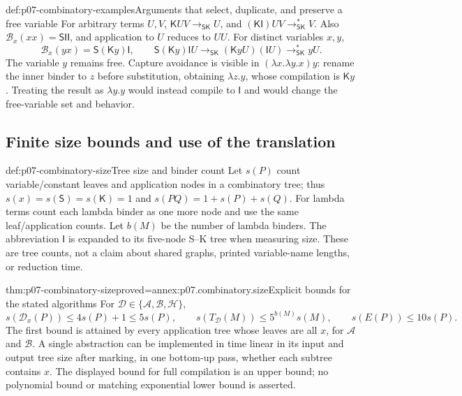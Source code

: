 \begin{hbexample}{def:p07-combinatory-examples}{Arguments that select, duplicate, and preserve a free variable}
For arbitrary terms \(U,V\), \(\mathsf KUV\longrightarrow_{\mathsf{SK}}U\),
and \((\mathsf K\mathsf I)UV\longrightarrow_{\mathsf{SK}}^*V\).
Also \(\mathcal B_x(xx)=\mathsf S\mathsf I\mathsf I\), and application to
\(U\) reduces to \(UU\).
For distinct variables \(x,y\),
\[
 \mathcal B_x(yx)=\mathsf S(\mathsf K y)\mathsf I,
 \qquad
 \mathsf S(\mathsf K y)\mathsf I U
 \longrightarrow_{\mathsf{SK}}(\mathsf K yU)(\mathsf I U)
 \longrightarrow_{\mathsf{SK}}^*yU.
\]
The variable \(y\) remains free.  Capture avoidance is visible in
\((\lambda x.\lambda y.x)y\): rename the inner binder to \(z\) before
substitution, obtaining \(\lambda z.y\), whose compilation is
\(\mathsf K y\).  Treating the result as \(\lambda y.y\) would instead compile
to \(\mathsf I\) and would change the free-variable set and behavior.
\end{hbexample}

\subsection{Finite size bounds and use of the translation}
\label{sec:p07-combinatory-size}

\begin{hbdefinition}{def:p07-combinatory-size}{Tree size and binder count}
Let \(s(P)\) count variable/constant leaves and application nodes in a combinatory
tree; thus \(s(x)=s(\mathsf S)=s(\mathsf K)=1\) and
\(s(PQ)=1+s(P)+s(Q)\).  For lambda terms count each lambda binder as one more
node and use the same leaf/application counts.  Let \(b(M)\) be the number of
lambda binders.  The abbreviation \(\mathsf I\) is expanded to its five-node
S--K tree when measuring size.  These are tree counts, not a claim about shared
graphs, printed variable-name lengths, or reduction time.
\end{hbdefinition}

\begin{hbtheorem}{thm:p07-combinatory-size}{proved=annex:p07.combinatory.size}{Explicit bounds for the stated algorithms}
For \(\mathcal D\in\{\mathcal A,\mathcal B,\mathcal H\}\),
\[
 s(\mathcal D_x(P))\leq4s(P)+1\leq5s(P),\qquad
 s(T_{\mathcal D}(M))\leq5^{b(M)}s(M),\qquad
 s(E(P))\leq10s(P).
\]
The first bound is attained by every application tree whose leaves are all
\(x\), for \(\mathcal A\) and \(\mathcal B\).
A single abstraction can be implemented in time linear in its input and output
tree size after marking, in one bottom-up pass, whether each subtree contains
\(x\).  The displayed bound for full compilation is an upper bound; no
polynomial bound or matching exponential lower bound is asserted.
\end{hbtheorem}

